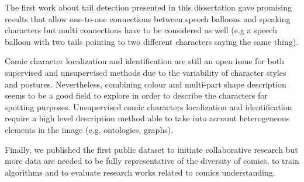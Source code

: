 The first work about tail detection presented in this dissertation gave promising results that allow one-to-one connections between speech balloons and speaking characters but multi connections have to be considered as well (e.g a speech balloon with two tails pointing to two different characters saying the same thing).

Comic character localization and identification are still an open issue for both supervised and unsupervised methods due to the variability of character styles and postures.
Nevertheless, combining colour and multi-part shape description seems to be a good field to explore in order to describe the characters for spotting purposes.
Unsupervised comic characters localization and identification require a high level description method able to take into account heterogeneous elements in the image (e.g. ontologies, graphs).

Finally, we published the first public dataset to initiate collaborative research but more data are needed to be fully representative of the diversity of comics, to train algorithms and to evaluate research works related to comics understanding.

